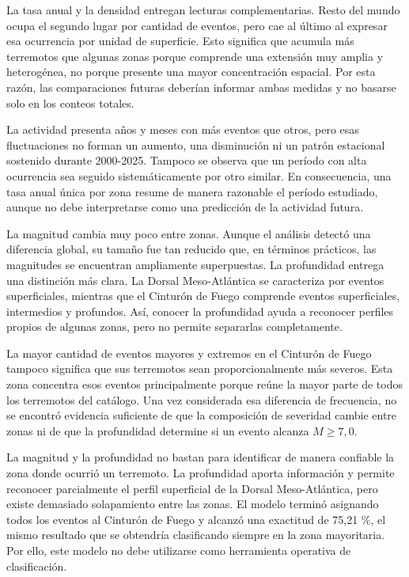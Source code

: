 \documentclass[
  spanish,
  letterpaper,
  DIV=11,
  numbers=noendperiod]{scrartcl}
\begin{document}
La tasa anual y la densidad entregan lecturas complementarias. Resto del
mundo ocupa el segundo lugar por cantidad de eventos, pero cae al último
al expresar esa ocurrencia por unidad de superficie. Esto significa que
acumula más terremotos que algunas zonas porque comprende una extensión
muy amplia y heterogénea, no porque presente una mayor concentración
espacial. Por esta razón, las comparaciones futuras deberían informar
ambas medidas y no basarse solo en los conteos totales.

La actividad presenta años y meses con más eventos que otros, pero esas
fluctuaciones no forman un aumento, una disminución ni un patrón
estacional sostenido durante 2000-2025. Tampoco se observa que un
período con alta ocurrencia sea seguido sistemáticamente por otro
similar. En consecuencia, una tasa anual única por zona resume de manera
razonable el período estudiado, aunque no debe interpretarse como una
predicción de la actividad futura.

La magnitud cambia muy poco entre zonas. Aunque el análisis detectó una
diferencia global, su tamaño fue tan reducido que, en términos
prácticos, las magnitudes se encuentran ampliamente superpuestas. La
profundidad entrega una distinción más clara. La Dorsal Meso-Atlántica
se caracteriza por eventos superficiales, mientras que el Cinturón de
Fuego comprende eventos superficiales, intermedios y profundos. Así,
conocer la profundidad ayuda a reconocer perfiles propios de algunas
zonas, pero no permite separarlas completamente.

La mayor cantidad de eventos mayores y extremos en el Cinturón de Fuego
tampoco significa que sus terremotos sean proporcionalmente más severos.
Esta zona concentra esos eventos principalmente porque reúne la mayor
parte de todos los terremotos del catálogo. Una vez considerada esa
diferencia de frecuencia, no se encontró evidencia suficiente de que la
composición de severidad cambie entre zonas ni de que la profundidad
determine si un evento alcanza \(M \geq 7{,}0\).

La magnitud y la profundidad no bastan para identificar de manera
confiable la zona donde ocurrió un terremoto. La profundidad aporta
información y permite reconocer parcialmente el perfil superficial de la
Dorsal Meso-Atlántica, pero existe demasiado solapamiento entre las
zonas. El modelo terminó asignando todos los eventos al Cinturón de
Fuego y alcanzó una exactitud de 75,21 \%, el mismo resultado que se
obtendría clasificando siempre en la zona mayoritaria. Por ello, este
modelo no debe utilizarse como herramienta operativa de clasificación.
\end{document}
